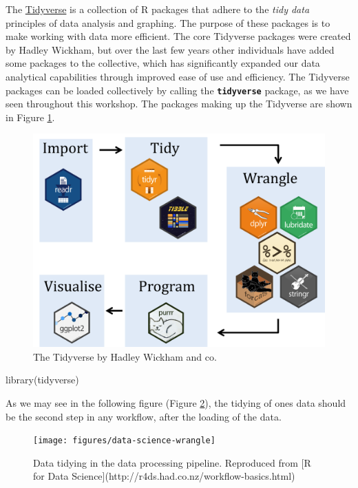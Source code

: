 \documentclass[
]{book}
\newenvironment{Shaded}{\begin{snugshade}}{\end{snugshade}}
\newcommand{\FunctionTok}[1]{\textcolor[rgb]{0.00,0.00,0.00}{#1}}
\newcommand{\NormalTok}[1]{#1}
\begin{document}
The \href{http://tidyverse.org}{Tidyverse} is a collection of R packages that adhere to the \emph{tidy data} principles of data analysis and graphing. The purpose of these packages is to make working with data more efficient. The core Tidyverse packages were created by Hadley Wickham, but over the last few years other individuals have added some packages to the collective, which has significantly expanded our data analytical capabilities through improved ease of use and efficiency. The Tidyverse packages can be loaded collectively by calling the \textbf{\texttt{tidyverse}} package, as we have seen throughout this workshop. The packages making up the Tidyverse are shown in Figure \ref{fig:tidyverse}.

\begin{figure}

{\centering \includegraphics[width=1\linewidth]{figures/tidy_workflow} 

}

\caption{The Tidyverse by Hadley Wickham and co.}\label{fig:tidyverse}
\end{figure}

\begin{Shaded}
\begin{Highlighting}[]
\FunctionTok{library}\NormalTok{(tidyverse)}
\end{Highlighting}
\end{Shaded}

As we may see in the following figure (Figure \ref{fig:tidy}), the tidying of ones data should be the second step in any workflow, after the loading of the data.

\begin{figure}

{\centering \texttt{[image: figures/data-science-wrangle]} 

}

\caption{Data tidying in the data processing pipeline. Reproduced from [R for Data Science](http://r4ds.had.co.nz/workflow-basics.html)}\label{fig:tidy}
\end{figure}
\end{document}
